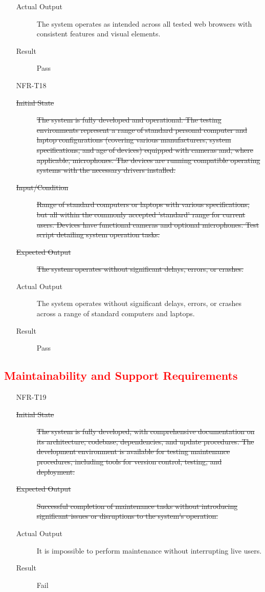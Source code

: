 \documentclass[12pt, titlepage]{article}
\newcommand{\rt}[1]{\textcolor{red}{#1}}
\begin{document}
\begin{enumerate}
\begin{description}
      \item[Actual Output] The system operates as intended across all tested web
        browsers with consistent features and visual elements.
      \item[Result] Pass
      \end{description}
    \item[NFR-T18] \label{NFRT18}
      \begin{description}
      \item[\sout{Initial State}] \sout{The system is fully developed and
          operational. The testing environments represent a range of standard
          personal computer and laptop configurations (covering various
          manufacturers, system specifications, and age of devices) equipped
          with cameras and, where applicable, microphones. The devices are
          running compatible operating systems with the necessary drivers
          installed.}
      \item[\sout{Input/Condition}] \sout{Range of standard computers or laptops
          with various specifications, but all within the commonly accepted
          'standard' range for current users. Devices have functional cameras
          and optional microphones. Test script detailing system operation
          tasks.}
      \item[\sout{Expected Output}] \sout{The system operates without significant
          delays, errors, or crashes.}
      \item[Actual Output] The system operates without significant delays, errors, or
        crashes across a range of standard computers and laptops.
      \item[Result] Pass
      \end{description}
  \end{enumerate}

  \rt{ \subsection{Maintainability and Support Requirements} }
  \begin{enumerate}
    \item[NFR-T19] \label{NFRT19}
      \begin{description}
      \item[\sout{Initial State}] \sout{The system is fully developed, with
          comprehensive documentation on its architecture, codebase,
          dependencies, and update procedures. The development environment is
          available for testing maintenance procedures, including tools for
          version control, testing, and deployment.}
      \item[\sout{Expected Output}] \sout{Successful completion of maintenance
          tasks without introducing significant issues or disruptions to the
          system's operation.}
      \item[Actual Output] It is impossible to perform maintenance without
        interrupting live users.
      \item[Result] Fail
      \end{description}
    \addtocounter{enumi}{2}
  \end{enumerate}
\end{document}
